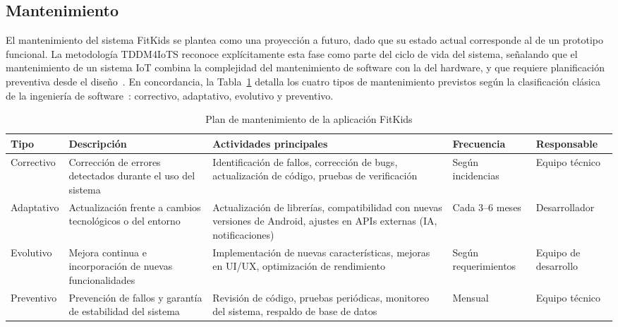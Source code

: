 				\subsection{Mantenimiento}
				\label{sec:mant}
					El mantenimiento del sistema FitKids se plantea como una proyección a futuro, dado que su estado actual corresponde al de un prototipo funcional. La metodología TDDM4IoTS reconoce explícitamente esta fase como parte del ciclo de vida del sistema, señalando que el mantenimiento de un sistema IoT combina la complejidad del mantenimiento de software con la del hardware, y que requiere planificación preventiva desde el diseño~\cite{GuerreroUlloa2024}. En concordancia, la Tabla~\ref{tab:mantenimiento} detalla los cuatro tipos de mantenimiento previstos según la clasificación clásica de la ingeniería de software~\cite{Pressman2019}: correctivo, adaptativo, evolutivo y preventivo.
					
					\begin{table}[H]
						\centering\small
						\caption{Plan de mantenimiento de la aplicación FitKids}
						\label{tab:mantenimiento}
						\begin{tabular}{p{2.6cm}p{2.8cm}p{3.8cm}p{2.4cm}p{2.4cm}}
							\hline
							\textbf{Tipo} & \textbf{Descripción} & \textbf{Actividades principales} & \textbf{Frecuencia} & \textbf{Responsable}\\
							\hline
							Correctivo & Corrección de errores detectados durante el uso del sistema & Identificación de fallos, corrección de bugs, actualización de código, pruebas de verificación & Según incidencias & Equipo técnico\\
							Adaptativo & Actualización frente a cambios tecnológicos o del entorno & Actualización de librerías, compatibilidad con nuevas versiones de Android, ajustes en APIs externas (IA, notificaciones) & Cada 3--6 meses & Desarrollador\\
							Evolutivo & Mejora continua e incorporación de nuevas funcionalidades & Implementación de nuevas características, mejoras en UI/UX, optimización de rendimiento & Según requerimientos & Equipo de desarrollo\\
							Preventivo & Prevención de fallos y garantía de estabilidad del sistema & Revisión de código, pruebas periódicas, monitoreo del sistema, respaldo de base de datos & Mensual & Equipo técnico\\
							\hline
						\end{tabular}
					\end{table}
					\tblnote
